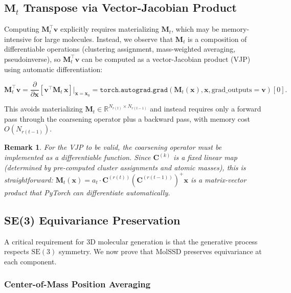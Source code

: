 \documentclass[12pt,a4paper]{article}
\newtheorem{remark}[theorem]{Remark}
\providecommand{\R}{}
\renewcommand{\R}{\mathbb{R}}
\newcommand{\bx}{\bm{x}}
\newcommand{\Mt}{\bm{M}_t}
\begin{document}
\subsection{\texorpdfstring{$\Mt$}{M\_t} Transpose via Vector-Jacobian Product}\label{sec:vjp}

Computing $\Mt^\top \bm{v}$ explicitly requires materializing $\Mt$, which may be memory-intensive for large molecules. Instead, we observe that $\Mt$ is a composition of differentiable operations (clustering assignment, mass-weighted averaging, pseudoinverse), so $\Mt^\top \bm{v}$ can be computed as a vector-Jacobian product (VJP) using automatic differentiation:

\begin{equation}\label{eq:vjp}
    \Mt^\top \bm{v} = \frac{\partial}{\partial \bx}\left[\bm{v}^\top \Mt\, \bx\right]\bigg|_{\bx = \bx_0} = \texttt{torch.autograd.grad}(\Mt(\bx), \bx, \text{grad\_outputs}=\bm{v})[0].
\end{equation}

This avoids materializing $\Mt \in \R^{N_{r(t)} \times N_{r(t-1)}}$ and instead requires only a forward pass through the coarsening operator plus a backward pass, with memory cost $O(N_{r(t-1)})$.

\begin{remark}
For the VJP to be valid, the coarsening operator must be implemented as a differentiable function. Since $\bm{C}^{(k)}$ is a fixed linear map (determined by pre-computed cluster assignments and atomic masses), this is straightforward: $\Mt(\bx) = a_t \cdot \bm{C}^{(r(t))} (\bm{C}^{(r(t-1))})^+ \bx$ is a matrix-vector product that PyTorch can differentiate automatically.
\end{remark}

\subsection{SE(3) Equivariance Preservation}\label{sec:equivariance}

A critical requirement for 3D molecular generation is that the generative process respects $\mathrm{SE}(3)$ symmetry. We now prove that MolSSD preserves equivariance at each component.

\subsubsection{Center-of-Mass Position Averaging}
\end{document}
